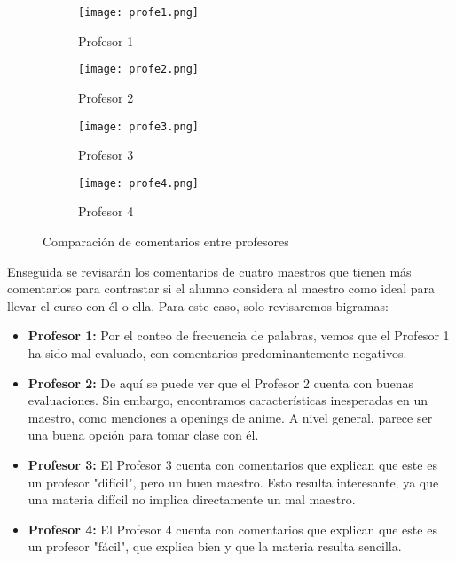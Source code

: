 \documentclass[a4paper,12pt]{article}
\begin{document}
\begin{figure}[h!]
    \centering
    \begin{subfigure}[b]{0.45\textwidth}
        \texttt{[image: profe1.png]}
        \caption{Profesor 1}
        \label{fig:profe1}
    \end{subfigure}
    \hfill
    \begin{subfigure}[b]{0.45\textwidth}
        \texttt{[image: profe2.png]}
        \caption{Profesor 2}
        \label{fig:profe2}
    \end{subfigure}

    \vspace{0.5cm} %

    \begin{subfigure}[b]{0.45\textwidth}
        \texttt{[image: profe3.png]}
        \caption{Profesor 3}
        \label{fig:profe3}
    \end{subfigure}
    \hfill
    \begin{subfigure}[b]{0.45\textwidth}
        \texttt{[image: profe4.png]}
        \caption{Profesor 4}
        \label{fig:profe4}
    \end{subfigure}
    \caption{Comparación de comentarios entre profesores}
    \label{fig:composicion_profe}
\end{figure}




Enseguida se revisarán los comentarios de cuatro maestros que tienen más comentarios para contrastar si el alumno considera al maestro como ideal para llevar el curso con él o ella. Para este caso, solo revisaremos bigramas:

\begin{itemize}
    \item \textbf{Profesor 1:} Por el conteo de frecuencia de palabras, vemos que el Profesor 1 ha sido mal evaluado, con comentarios predominantemente negativos.
    \item \textbf{Profesor 2:} De aquí se puede ver que el Profesor 2 cuenta con buenas evaluaciones. Sin embargo, encontramos características inesperadas en un maestro, como menciones a openings de anime. A nivel general, parece ser una buena opción para tomar clase con él.
    \item \textbf{Profesor 3:} El Profesor 3 cuenta con comentarios que explican que este es un profesor "difícil", pero un buen maestro. Esto resulta interesante, ya que una materia difícil no implica directamente un mal maestro.
    \item \textbf{Profesor 4:} El Profesor 4 cuenta con comentarios que explican que este es un profesor "fácil", que explica bien y que la materia resulta sencilla.
\end{itemize}
\end{document}
